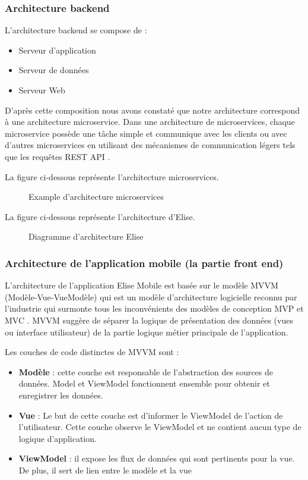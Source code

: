 \subsubsection{Architecture backend}
L'architecture backend se compose de :
\begin{itemize}
  \item Serveur d'application  
  \item Serveur de données  
  \item Serveur Web 
\end{itemize}

D'après cette composition nous avons constaté que notre architecture correspond à une architecture microservice.
Dans une architecture de microservices, chaque microservice possède une tâche simple et communique avec les clients ou avec d'autres microservices en utilisant des mécanismes de communication légers tels que les requêtes REST API \cite{microservice}.

La figure ci-dessous représente l'architecture microservices. \\
\pagebreak
\begin{figure}[H]
  \centering
  \caption{Example d'architecture microservices}
  \label{fig:microservice_architecture}
\end{figure}
La figure ci-dessous représente l'architecture d'Elise. \\
\begin{figure}[H]
  \centering
  \caption{Diagramme d'architecture Elise}
  \label{fig:digramme_architecture}
\end{figure}

\subsubsection{Architecture de l'application mobile (la partie front end)}
L'architecture de l'application Elise Mobile est basée sur le modèle MVVM (Modèle-Vue-VueModèle) qui est un modèle d'architecture logicielle reconnu par l'industrie qui surmonte tous les inconvénients des modèles de conception MVP et MVC . MVVM suggère de séparer la logique de
présentation des données (vues ou interface utilisateur) de la partie logique métier principale de l'application.

Les couches de code distinctes de MVVM sont :
\begin{itemize}
  \item \textbf{Modèle} : cette couche est responsable de l'abstraction des sources de données. Model et ViewModel fonctionnent ensemble pour obtenir et enregistrer les données.\cite{mvvm}
  \item \textbf{Vue} : Le but de cette couche est d'informer le ViewModel de l'action de l'utilisateur. Cette couche observe le ViewModel et ne contient aucun type de logique d'application.\cite{mvvm}
  \item \textbf{ViewModel} : il expose les flux de données qui sont pertinents pour la vue. De plus, il sert de lien entre le modèle et la vue\cite{mvvm}
\end{itemize}

